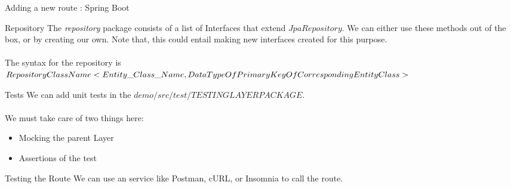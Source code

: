 \documentclass[
10pt, %
a4paper, %
oneside, %
headinclude,footinclude, %
BCOR5mm, %
]{scrartcl}
\begin{document}
\begin{section}{Adding a new route : Spring Boot}
\begin{subsection}{Repository}
The \textit{repository} package consists of a list of Interfaces that extend $JpaRepository$. We can either use these methods out of the box, or by creating our own. Note that, this could entail making new interfaces created for this purpose. \\ \\
The syntax for the repository is \\ $RepositoryClassName<Entity\_Class\_Name \\, DataTypeOfPrimaryKeyOfCorrespondingEntityClass>$
\end{subsection}

\begin{subsection}{Tests}
We can add unit tests in the $demo/src/test/TESTINGLAYERPACKAGE$. \\ \\
We must take care of two things here: 
\begin{itemize}
    \item Mocking the parent Layer
    \item Assertions of the test
\end{itemize}
\end{subsection}

\begin{subsection}{Testing the Route}
We can use an service like Postman, cURL, or Insomnia to call the route.
\end{subsection}



\end{section}





\renewcommand{\refname}{\spacedlowsmallcaps{References}} %

% 
%


\printbibliography

\end{document}
